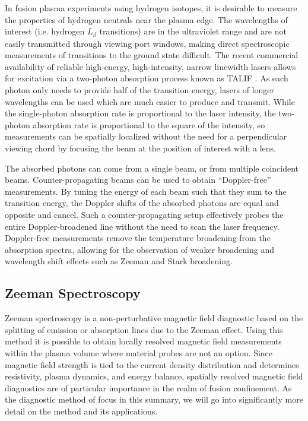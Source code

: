 \documentclass{jpp}
\begin{document}
In fusion plasma experiments using hydrogen isotopes, it is desirable to measure the properties of hydrogen neutrals near the plasma edge. The wavelengths of interest (i.e. hydrogen $L_\beta$ transitions) are in the ultraviolet range and are not easily transmitted through viewing port windows, making direct spectroscopic measurements of transitions to the ground state difficult. The recent commercial availability of reliable high-energy, high-intensity, narrow linewidth lasers allows for excitation via a two-photon absorption process known as TALIF \citep{MageeRM2012Atpa}. As each photon only needs to provide half of the transition energy, lasers of longer wavelengths can be used which are much easier to produce and transmit. While the single-photon absorption rate is proportional to the laser intensity, the two-photon absorption rate is proportional to the square of the intensity, so measurements can be spatially localized without the need for a perpendicular viewing chord by focusing the beam at the position of interest with a lens.

The absorbed photons can come from a single beam, or from multiple coincident beams. Counter-propagating beams can be used to obtain ``Doppler-free'' measurements. By tuning the energy of each beam such that they sum to the transition energy, the Doppler shifts of the absorbed photons are equal and opposite and cancel. Such a counter-propagating setup effectively probes the entire Doppler-broadened line without the need to scan the laser frequency. Doppler-free measurements remove the temperature broadening from the absorption spectra, allowing for the observation of weaker broadening and wavelength shift effects such as Zeeman and Stark broadening.

\subsection{Zeeman Spectroscopy}

Zeeman spectroscopy is a non-perturbative magnetic field diagnostic based on the splitting of emission or absorption lines due to the Zeeman effect. Using this method it is possible to obtain locally resolved magnetic field measurements within the plasma volume where material probes are not an option. Since magnetic field strength is tied to the current density distribution and determines resistivity, plasma dynamics, and energy balance, spatially resolved magnetic field diagnostics are of particular importance in the realm of fusion confinement. As the diagnostic method of focus in this summary, we will go into significantly more detail on the method and its applications.
\end{document}
